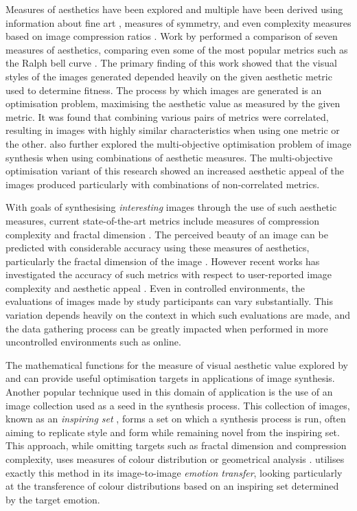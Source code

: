 \documentclass{article}
\begin{document}
Measures of aesthetics have been explored and multiple have been derived using information about fine art \citep{ralph-bell-curve}, measures of symmetry, and even complexity measures based on image compression ratios \citep{den2010using}.
Work by \citet{den2014investigating} performed a comparison of seven measures of aesthetics, comparing even some of the most popular metrics such as the Ralph bell curve \citep{ralph-bell-curve}.
The primary finding of this work showed that the visual styles of the images generated depended heavily on the given aesthetic metric used to determine fitness.
The process by which images are generated is an optimisation problem, maximising the aesthetic value as measured by the given metric.
It was found that combining various pairs of metrics were correlated, resulting in images with highly similar characteristics when using one metric or the other.
\citet{den2014investigating} also further explored the multi-objective optimisation problem of image synthesis when using combinations of aesthetic measures.
The multi-objective optimisation variant of this research showed an increased aesthetic appeal of the images produced particularly with combinations of non-correlated metrics.

With goals of synthesising \textit{interesting} images through the use of such aesthetic measures, current state-of-the-art metrics include measures of compression complexity and fractal dimension \citep{johnson2019understanding}.
The perceived beauty of an image can be predicted with considerable accuracy using these measures of aesthetics, particularly the fractal dimension of the image \citep{forsythe2011predicting}.
However recent works has investigated the accuracy of such metrics with respect to user-reported image complexity and aesthetic appeal \citep{johnson2019understanding}.
Even in controlled environments, the evaluations of images made by study participants can vary substantially.
This variation depends heavily on the context in which such evaluations are made, and the data gathering process can be greatly impacted when performed in more uncontrolled environments such as online.

The mathematical functions for the measure of visual aesthetic value explored by \citet{den2014investigating} and \citet{forsythe2011predicting} can provide useful optimisation targets in applications of image synthesis.
Another popular technique used in this domain of application is the use of an image collection used as a seed in the synthesis process.
This collection of images, known as an \textit{inspiring set} \citep{johnson2019understanding}, forms a set on which a synthesis process is run, often aiming to replicate style and form while remaining novel from the inspiring set.
This approach, while omitting targets such as fractal dimension and compression complexity, uses measures of colour distribution or geometrical analysis \citep{johnson2019understanding}.
\citet{kim2018building} utilises exactly this method in its image-to-image \textit{emotion transfer}, looking particularly at the transference of colour distributions based on an inspiring set determined by the target emotion.
\end{document}
